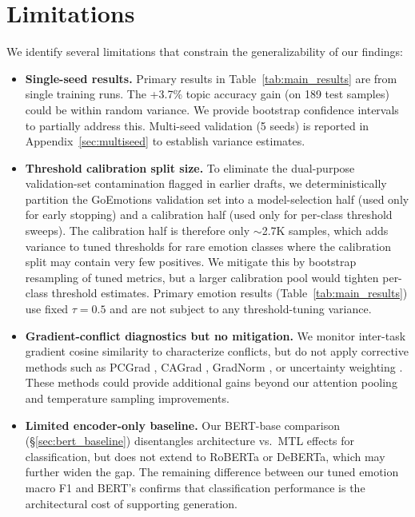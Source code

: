\documentclass[11pt]{article}
\begin{document}
\section*{Limitations}
\label{sec:limitations}

We identify several limitations that constrain the generalizability of our findings:

\begin{itemize}
    \item \textbf{Single-seed results.} Primary results in Table~\ref{tab:main_results} are from single training runs. The +3.7\% topic accuracy gain (on 189 test samples) could be within random variance. We provide bootstrap confidence intervals to partially address this. Multi-seed validation (5 seeds) is reported in Appendix~\ref{sec:multiseed} to establish variance estimates.

    \item \textbf{Threshold calibration split size.} To eliminate the dual-purpose validation-set contamination flagged in earlier drafts, we deterministically partition the GoEmotions validation set into a model-selection half (used only for early stopping) and a calibration half (used only for per-class threshold sweeps). The calibration half is therefore only $\sim$2.7K samples, which adds variance to tuned thresholds for rare emotion classes where the calibration split may contain very few positives. We mitigate this by bootstrap resampling of tuned metrics, but a larger calibration pool would tighten per-class threshold estimates. Primary emotion results (Table~\ref{tab:main_results}) use fixed $\tau=0.5$ and are not subject to any threshold-tuning variance.

    \item \textbf{Gradient-conflict diagnostics but no mitigation.} We monitor inter-task gradient cosine similarity to characterize conflicts, but do not apply corrective methods such as PCGrad \citep{yu2020gradient}, CAGrad \citep{liu2021conflict}, GradNorm \citep{chen2018gradnorm}, or uncertainty weighting \citep{kendall2018multi}. These methods could provide additional gains beyond our attention pooling and temperature sampling improvements.

    \item \textbf{Limited encoder-only baseline.} Our BERT-base comparison (\S\ref{sec:bert_baseline}) disentangles architecture vs.\ MTL effects for classification, but does not extend to RoBERTa or DeBERTa, which may further widen the gap. The remaining difference between our tuned emotion macro F1 and BERT's confirms that classification performance is the architectural cost of supporting generation.


\end{itemize}
\end{document}
